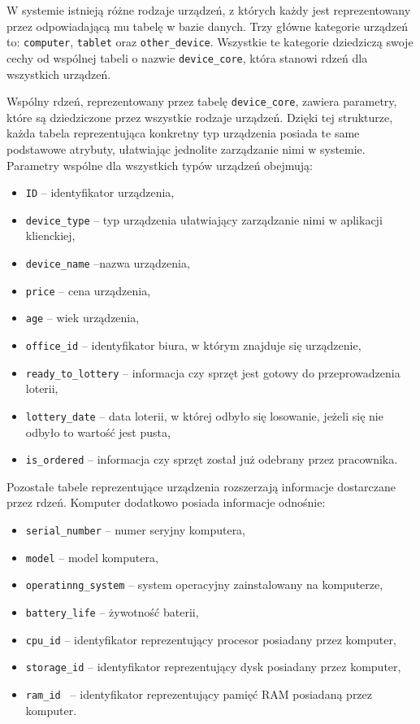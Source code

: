 W systemie istnieją różne rodzaje urządzeń, z których każdy jest reprezentowany przez odpowiadającą mu tabelę w bazie danych. Trzy główne kategorie urządzeń to: \texttt{computer}, \texttt{tablet} oraz \texttt{other\_device}. Wszystkie te kategorie dziedziczą swoje cechy od wspólnej tabeli o nazwie \texttt{device\_core}, która stanowi rdzeń dla wszystkich urządzeń.

Wspólny rdzeń, reprezentowany przez tabelę \texttt{device\_core}, zawiera parametry, które są dziedziczone przez wszystkie rodzaje urządzeń. Dzięki tej strukturze, każda tabela reprezentująca konkretny typ urządzenia posiada te same podstawowe atrybuty, ułatwiając jednolite zarządzanie nimi w systemie. Parametry wspólne dla wszystkich typów urządzeń obejmują: 
\begin{itemize}
	\item \texttt{ID} -- identyfikator urządzenia,
	\item \texttt{device\_type} -- typ urządzenia ułatwiający zarządzanie nimi w aplikacji klienckiej,
	\item \texttt{device\_name} --nazwa urządzenia,
	\item \texttt{price} -- cena urządzenia,
	\item \texttt{age} -- wiek urządzenia,
	\item \texttt{office\_id} -- identyfikator biura, w którym znajduje się urządzenie,
	\item \texttt{ready\_to\_lottery} -- informacja czy sprzęt jest gotowy do przeprowadzenia loterii,
	\item \texttt{lottery\_date} -- data loterii, w której odbyło się losowanie, jeżeli się nie odbyło to wartość jest pusta,
	\item \texttt{is\_ordered} -- informacja czy sprzęt został już odebrany przez pracownika.
\end{itemize}

Pozostałe tabele reprezentujące urządzenia rozszerzają informacje dostarczane przez rdzeń. Komputer dodatkowo posiada informacje odnośnie:
\begin{itemize}
	\item \texttt{serial\_number} -- numer seryjny komputera,
	\item \texttt{model} -- model komputera,
	\item \texttt{operatinng\_system} -- system operacyjny zainstalowany na komputerze,
	\item \texttt{battery\_life} -- żywotność baterii,
	\item \texttt{cpu\_id} -- identyfikator reprezentujący procesor posiadany przez komputer,
	\item \texttt{storage\_id} -- identyfikator reprezentujący dysk posiadany przez komputer,
	\item \texttt{ram\_id } -- identyfikator reprezentujący pamięć RAM posiadaną przez komputer.
\end{itemize}



